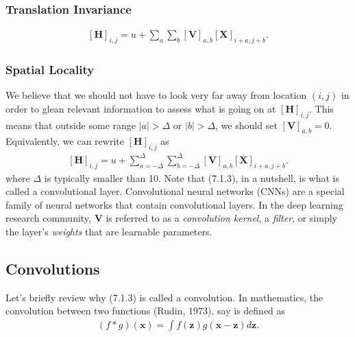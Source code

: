 \documentclass[a4paper,12pt]{article}
\theoremstyle{definition}
\begin{document}
\subsubsection*{Translation Invariance}
\begin{equation*}
    \begin{aligned}
        [\mathbf{H}]_{i, j} = u + \sum_a\sum_b [\mathbf{V}]_{a, b}  [\mathbf{X}]_{i+a, j+b}.
    \end{aligned}
\end{equation*}

\subsubsection*{Spatial Locality}
We believe that we should not have to look very far away from location $(i, j)$ in order to glean relevant information to assess what is going on at $[\mathbf{H}]_{i, j}$.
This means that outside some range $|a|> \Delta$ or $|b| > \Delta$, we should set $[\mathbf{V}]_{a, b} = 0$. Equivalently, we can rewrite $[\mathbf{H}]_{i, j}$ as
\begin{equation}
    \begin{aligned}
        [\mathbf{H}]_{i, j} = u + \sum_{a = -\Delta}^{\Delta} \sum_{b = -\Delta}^{\Delta} [\mathbf{V}]_{a, b}  [\mathbf{X}]_{i+a, j+b}.
    \end{aligned}
\end{equation}
where $\Delta$ is typically smaller than 10. Note that (7.1.3), in a nutshell, is what is called a convolutional layer. Convolutional neural networks (CNNs) are a special
family of neural networks that contain convolutional layers. In the deep learning research community, $\mathbf{V}$ is referred to as a \emph{convolution kernel}, a \emph{filter},
or simply the layer's \emph{weights} that are learnable parameters.

\subsection{Convolutions}
Let's briefly review why (7.1.3) is called a convolution. In mathematics, the convolution between two functions (Rudin, 1973), say
is defined as
\begin{equation*}
    \begin{aligned}
        (f * g)(\mathbf{x}) = \int f(\mathbf{z}) g(\mathbf{x}-\mathbf{z}) d\mathbf{z}.
    \end{aligned}
\end{equation*}
\end{document}
